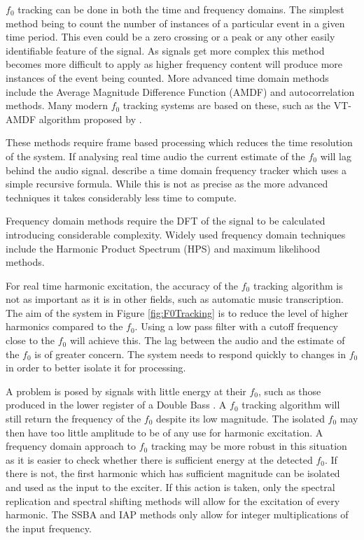 		$f_{0}$ tracking can be done in both the time and frequency domains. The simplest method being to count
		the number of instances of a particular event in a given time period. This even could be a zero crossing or
		a peak or any other easily identifiable feature of the signal. As signals get more complex this method
		becomes more difficult to apply as higher frequency content will produce more instances of the event being
		counted. More advanced time domain methods include the Average Magnitude Difference Function (AMDF) and
		autocorrelation methods. Many modern $f_{0}$ tracking systems are based on these, such as the VT-AMDF
		algorithm proposed by \citet{prukkanon2009vt-amdf}.

		These methods require frame based processing which reduces the time resolution of the system. If analysing
		real time audio the current estimate of the $f_{0}$ will lag behind the audio signal.
		\citet{larsen2004audio} describe a time domain frequency tracker which uses a simple recursive formula.
		While this is not as precise as the more advanced techniques it takes considerably less time to compute.

		Frequency domain methods require the DFT of the signal to be calculated introducing considerable
		complexity. Widely used frequency domain techniques include the Harmonic Product Spectrum (HPS) and maximum
		likelihood methods.

		For real time harmonic excitation, the accuracy of the $f_{0}$ tracking algorithm is not as important as it
		is in other fields, such as automatic music transcription. The aim of the system in Figure
		\ref{fig:F0Tracking} is to reduce the level of higher harmonics compared to the $f_{0}$. Using a low pass
		filter with a cutoff frequency close to the $f_{0}$ will achieve this. The lag between the audio and the
		estimate of the $f_{0}$ is of greater concern. The system needs to respond quickly to changes in $f_{0}$ in
		order to better isolate it for processing.

		A problem is posed by signals with little energy at their $f_{0}$, such as those produced in the lower
		register of a Double Bass \citep{askenfelt2010double}. A $f_{0}$ tracking algorithm will still return the
		frequency of the $f_{0}$ despite its low magnitude. The isolated $f_{0}$ may then have too little amplitude
		to be of any use for harmonic excitation. A frequency domain approach to $f_{0}$ tracking may be more
		robust in this situation as it is easier to check whether there is sufficient energy at the detected
		$f_{0}$. If there is not, the first harmonic which has sufficient magnitude can be isolated and used as the
		input to the exciter. If this action is taken, only the spectral replication and spectral shifting methods
		will allow for the excitation of every harmonic. The SSBA and IAP methods only allow for integer
		multiplications of the input frequency.

